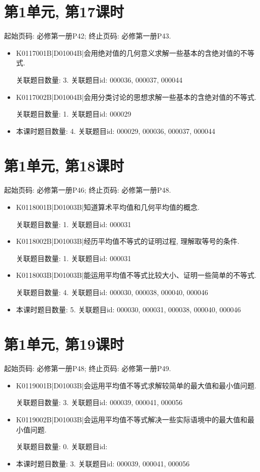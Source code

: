\section*{第1单元, 第17课时}
起始页码: 必修第一册P42; 终止页码: 必修第一册P43.
\begin{itemize}
\item K0117001B|D01004B|会用绝对值的几何意义求解一些基本的含绝对值的不等式.

关联题目数量: 3. 关联题目id: 000036, 000037, 000044

\item K0117002B|D01004B|会用分类讨论的思想求解一些基本的含绝对值的不等式.

关联题目数量: 1. 关联题目id: 000029

\item 本课时题目数量: 4. 关联题目id: 000029, 000036, 000037, 000044

\end{itemize}

\section*{第1单元, 第18课时}
起始页码: 必修第一册P46; 终止页码: 必修第一册P48.
\begin{itemize}
\item K0118001B|D01003B|知道算术平均值和几何平均值的概念.

关联题目数量: 1. 关联题目id: 000031

\item K0118002B|D01003B|经历平均值不等式的证明过程, 理解取等号的条件.

关联题目数量: 1. 关联题目id: 000031

\item K0118003B|D01003B|能运用平均值不等式比较大小、证明一些简单的不等式.

关联题目数量: 4. 关联题目id: 000030, 000038, 000040, 000046

\item 本课时题目数量: 5. 关联题目id: 000030, 000031, 000038, 000040, 000046

\end{itemize}

\section*{第1单元, 第19课时}
起始页码: 必修第一册P48; 终止页码: 必修第一册P49.
\begin{itemize}
\item K0119001B|D01003B|会运用平均值不等式求解较简单的最大值和最小值问题.

关联题目数量: 3. 关联题目id: 000039, 000041, 000056

\item K0119002B|D01003B|会运用平均值不等式解决一些实际语境中的最大值和最小值问题.

关联题目数量: 0. 关联题目id: 

\item 本课时题目数量: 3. 关联题目id: 000039, 000041, 000056

\end{itemize}

